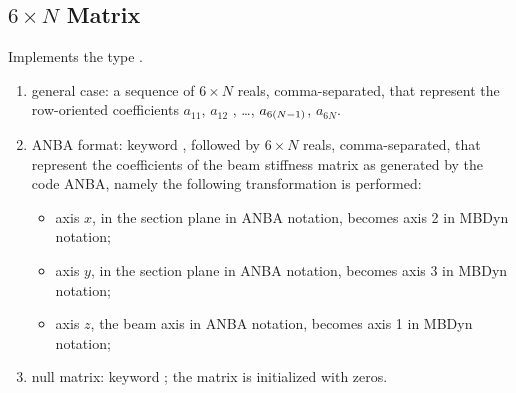 \subsection{$6 \times N$ Matrix}
\label{sec:Mat6xN}
Implements the type .
\begin{enumerate}
    \item general case: a sequence of $6 \times N$ reals, comma-separated, that
    represent the row-oriented coefficients $ a_{11} $, $ a_{12}$ ,
    \ldots, $ a_{6\left( N-1 \right)} $, $ a_{6N} $.
    \item ANBA format: keyword , followed by $6 \times N$ reals,
    comma-separated, that represent the coefficients of the beam stiffness
    matrix as generated by the code ANBA, namely the following
    transformation is performed:
    \begin{itemize}
        \item axis $ x $, in the section plane in ANBA notation, 
	becomes axis 2 in MBDyn notation;    
	\item axis $ y $, in the section plane in ANBA notation, 
	becomes axis 3 in MBDyn notation;    
	\item axis $ z $, the beam axis in ANBA notation, 
	becomes axis 1 in MBDyn notation;    
    \end{itemize}
    \item null matrix: keyword ; the matrix is initialized 
    with zeros.
\end{enumerate}

